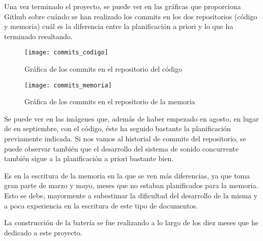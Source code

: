             Una vez terminado el proyecto, se puede ver en las gráficas que proporciona Github sobre cuándo se han
            realizado los commits en los dos repositorios (código y memoria) cuál es la diferencia entre la
            planificación a priori y lo que ha terminado resultando.

            \begin{figure}[ht]
                \centering
                \texttt{[image: commits\_codigo]}
                \caption{Gráfica de los commits en el repositorio del código\label{fig:CommitsCodigo}}
            \end{figure}

            \begin{figure}[ht]
                \centering
                \texttt{[image: commits\_memoria]}
                \caption{Gráfica de los commits en el repositorio de la memoria\label{fig:CommitsMemoria}}
            \end{figure}

            Se puede ver en las imágenes que, además de haber empezado en agosto, en lugar de en septiembre, con el
            código, éste ha seguido bastante la planificación previamente indicada. Si nos vamos al historial de commits
            del repositorio, se puede observar también que el desarrollo del sistema de sonido concurrente también sigue
            a la planificación a priori bastante bien.

            Es en la escritura de la memoria en la que se ven más diferencias, ya que toma gran parte de marzo y mayo,
            meses que no estaban planificados para la memoria. Esto se debe, mayormente a subestimar la dificultad del
            desarrollo de la misma y a poca experiencia en la escritura de este tipo de documentos.

            La construcción de la batería se fue realizando a lo largo de los diez meses que he dedicado a este
            proyecto.



